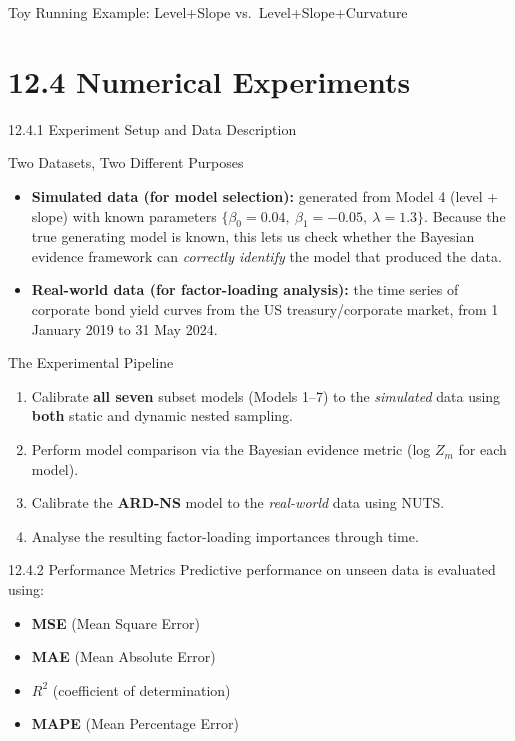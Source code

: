 \documentclass[aspectratio=169,10pt]{beamer}
\begin{document}
\begin{frame}[allowframebreaks]{Toy Running Example: Level+Slope vs.\ Level+Slope+Curvature}
\end{frame}

\section{12.4 Numerical Experiments}

\begin{frame}[allowframebreaks]{12.4.1 Experiment Setup and Data Description}

\begin{block}{Two Datasets, Two Different Purposes}
\begin{itemize}
  \item \textbf{Simulated data (for model selection):} generated from Model 4 (level + slope) with known parameters $\{\beta_0=0.04,\ \beta_1=-0.05,\ \lambda=1.3\}$. Because the true generating model is known, this lets us check whether the Bayesian evidence framework can \emph{correctly identify} the model that produced the data.
  \item \textbf{Real-world data (for factor-loading analysis):} the time series of corporate bond yield curves from the US treasury/corporate market, from 1 January 2019 to 31 May 2024.
\end{itemize}
\end{block}

\begin{block}{The Experimental Pipeline}
\begin{enumerate}
  \item Calibrate \textbf{all seven} subset models (Models 1--7) to the \emph{simulated} data using \textbf{both} static and dynamic nested sampling.
  \item Perform model comparison via the Bayesian evidence metric (log $Z_m$ for each model).
  \item Calibrate the \textbf{ARD-NS} model to the \emph{real-world} data using NUTS.
  \item Analyse the resulting factor-loading importances through time.
\end{enumerate}
\end{block}

\framebreak

\begin{block}{12.4.2 Performance Metrics}
Predictive performance on unseen data is evaluated using:
\begin{itemize}
  \item \textbf{MSE} (Mean Square Error)
  \item \textbf{MAE} (Mean Absolute Error)
  \item \textbf{$R^2$} (coefficient of determination)
  \item \textbf{MAPE} (Mean Percentage Error)
\end{itemize}
\end{block}


\end{frame}
\end{document}
